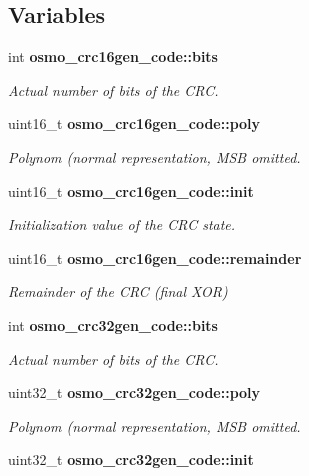 \subsection*{Variables}
\begin{DoxyCompactItemize}
\item 
int {\bf osmo\-\_\-crc16gen\-\_\-code\-::bits}\label{group__crcgen_ga96292309cf771e1086f86ccfd4bac9b2}

\begin{DoxyCompactList}\small\item\em Actual number of bits of the C\-R\-C. \end{DoxyCompactList}\item 
uint16\-\_\-t {\bf osmo\-\_\-crc16gen\-\_\-code\-::poly}\label{group__crcgen_gaedd08f5b95d016f3f09fc8bd7941c4e3}

\begin{DoxyCompactList}\small\item\em Polynom (normal representation, M\-S\-B omitted. \end{DoxyCompactList}\item 
uint16\-\_\-t {\bf osmo\-\_\-crc16gen\-\_\-code\-::init}\label{group__crcgen_gaecf697df2c87f82d77273fc3170f06b2}

\begin{DoxyCompactList}\small\item\em Initialization value of the C\-R\-C state. \end{DoxyCompactList}\item 
uint16\-\_\-t {\bf osmo\-\_\-crc16gen\-\_\-code\-::remainder}\label{group__crcgen_gaeff1e62578a8f7b2474aa8765b9b874d}

\begin{DoxyCompactList}\small\item\em Remainder of the C\-R\-C (final X\-O\-R) \end{DoxyCompactList}\item 
int {\bf osmo\-\_\-crc32gen\-\_\-code\-::bits}\label{group__crcgen_gab7ea0542721265f02d540fc95fb48fda}

\begin{DoxyCompactList}\small\item\em Actual number of bits of the C\-R\-C. \end{DoxyCompactList}\item 
uint32\-\_\-t {\bf osmo\-\_\-crc32gen\-\_\-code\-::poly}\label{group__crcgen_ga38fbc53e41d3181a2123c62253f9ee25}

\begin{DoxyCompactList}\small\item\em Polynom (normal representation, M\-S\-B omitted. \end{DoxyCompactList}\item 
uint32\-\_\-t {\bf osmo\-\_\-crc32gen\-\_\-code\-::init}\label{group__crcgen_gad139d035aff276d724db17c41b2147d8}


\end{DoxyCompactItemize}
